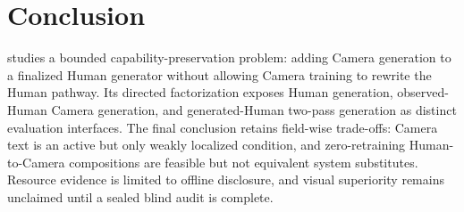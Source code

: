 \section{Conclusion}

\storymotion{} studies a bounded capability-preservation problem: adding Camera generation to a
finalized Human generator without allowing Camera training to rewrite the Human pathway. Its
directed factorization exposes Human generation, observed-Human Camera generation, and
generated-Human two-pass generation as distinct evaluation interfaces. The final conclusion
retains field-wise trade-offs: Camera text is an active but only weakly localized condition, and
zero-retraining Human-to-Camera compositions are feasible but not equivalent system substitutes.
Resource evidence is limited to offline disclosure, and visual superiority remains unclaimed
until a sealed blind audit is complete.
